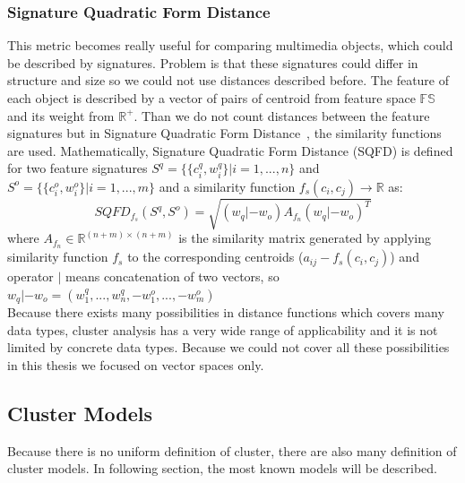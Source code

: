 \subsubsection{Signature Quadratic Form Distance}
This metric becomes really useful for comparing multimedia objects, which could be described by signatures. Problem is that these signatures could differ in structure and size so we could not use distances described before. The feature of each object is described by a vector of pairs of centroid from feature space $\mathbb{FS}$ and its weight from $\mathbb{R^{+}}$.
Than we do not count distances between the feature signatures but in Signature Quadratic Form Distance~\cite{Beecks10}, the similarity functions are used.
Mathematically, Signature Quadratic Form Distance (SQFD) is defined for two feature signatures $S^{q} = \{\{c_i^q, w_i^q\}|i=1,...,n\}$ and $S^{o} = \{\{c_i^o, w_i^o\}|i=1,...,m\}$ and a similarity function $f_s(c_i,c_j) \to \mathbb{R}$ as:
$$SQFD_{f_s}(S^q,S^o)=\sqrt{(w_q|-w_o)A_{f_n}(w_q|-w_o)^T}$$
where $A_{f_n} \in \mathbb{R}^{(n+m)\times(n+m)}$ is the similarity matrix generated by applying similarity function $f_s$ to the corresponding centroids ($a_{ij}-f_s(c_i,c_j)$) and operator $|$ means concatenation of two vectors, so $w_q|-w_o = (w_1^q,...,w_n^q,-w_1^o,...,-w_m^o)$\\

Because there exists many possibilities in distance functions which covers many data types, cluster analysis has a very wide range of applicability and it is not limited by concrete data types. Because we could not cover all these possibilities in this thesis we focused on vector spaces only.

\subsection{Cluster Models}
Because there is no uniform definition of cluster, there are also many definition of cluster models. In following section, the most known models will be described.

